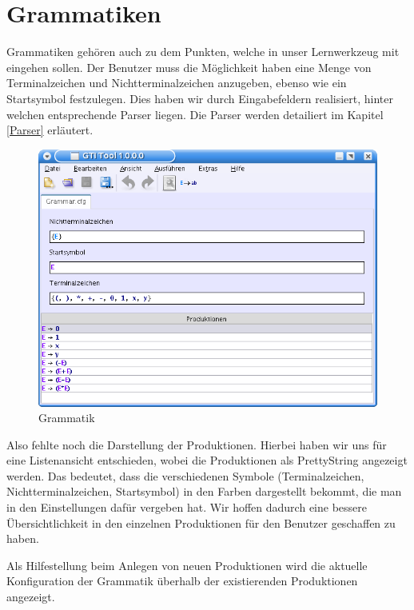 

\chapter{Grammatiken}\label{Grammars}

Grammatiken gehören auch zu dem Punkten, welche in unser Lernwerkzeug mit
eingehen sollen. Der Benutzer muss die Möglichkeit haben eine Menge von
Terminalzeichen und Nichtterminalzeichen anzugeben, ebenso wie ein Startsymbol
festzulegen. Dies haben wir durch Eingabefeldern realisiert, hinter welchen
entsprechende Parser liegen. Die Parser werden detailiert im Kapitel
\ref{Parser} erläutert.

  \begin{figure}[h!]
  \begin{center}
  \includegraphics[width=12cm]{../images/cfg_example.png}
  \caption{Grammatik}
  \end{center}
  \end{figure}


Also fehlte noch die Darstellung der Produktionen. Hierbei haben wir uns für
eine Listenansicht entschieden, wobei die Produktionen als PrettyString
angezeigt werden. Das bedeutet, dass die verschiedenen Symbole
(Terminalzeichen, Nichtterminalzeichen, Startsymbol) in den Farben dargestellt
bekommt, die man in den Einstellungen dafür vergeben hat. Wir hoffen dadurch
eine bessere Übersichtlichkeit in den einzelnen Produktionen für den Benutzer
geschaffen zu haben.\vspace{10pt}

Als Hilfestellung beim Anlegen von neuen Produktionen wird die aktuelle
Konfiguration der Grammatik überhalb der existierenden Produktionen angezeigt.


